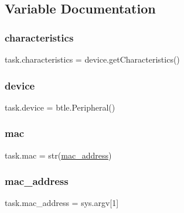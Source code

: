 \subsection{Variable Documentation}
\mbox{\label{namespacetask_a9c0131894acd916b23c9d507e5823a44}} 
\subsubsection{\texorpdfstring{characteristics}{characteristics}}
{\footnotesize\ttfamily task.\+characteristics = device.\+get\+Characteristics()}

\mbox{\label{namespacetask_a75e3efb7d8c413bc7f928bec6e72ec6e}} 
\subsubsection{\texorpdfstring{device}{device}}
{\footnotesize\ttfamily task.\+device = btle.\+Peripheral()}

\mbox{\label{namespacetask_a1e9118d2b9afdf73e26df673192cd38f}} 
\subsubsection{\texorpdfstring{mac}{mac}}
{\footnotesize\ttfamily task.\+mac = str(\hyperlink{namespacetask_a178a6511c8266d313ee6d314e5bf96dd}{mac\+\_\+address})}

\mbox{\label{namespacetask_a178a6511c8266d313ee6d314e5bf96dd}} 
\subsubsection{\texorpdfstring{mac\+\_\+address}{mac\_address}}
{\footnotesize\ttfamily task.\+mac\+\_\+address = sys.\+argv\mbox{[}1\mbox{]}}

\mbox{\label{namespacetask_a98d48fce73867d3374ad234fd7f6f48c}} 
